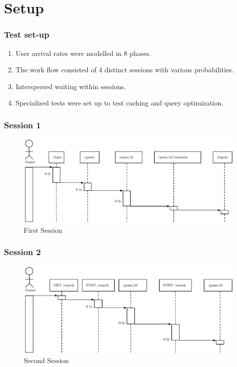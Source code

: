 \section{Setup}
\begin{frame}
\frametitle{Test set-up}

\begin{enumerate}[<+->]
	\setlength\itemsep{1em}
	\item User arrival rates were modelled in 8 phases.
	\item The work flow consisted of 4 distinct sessions with various probabilities.
	\item Interspersed waiting within sessions.
	\item Specialized tests were set up to test caching and query optimization.  
\end{enumerate}
\end{frame}

\begin{frame}
\frametitle{Session 1}
\begin{figure}[h]
	\centering
	\includegraphics[width=1\textwidth, height=0.5\textheight]{images/generic-1.pdf}
	\caption{First Session}\label{fig:sqlopt}
\end{figure}
\end{frame}

\begin{frame}
\frametitle{Session 2}
\begin{figure}[h]
	\centering
	\includegraphics[width=1\textwidth, height=0.5\textheight]{images/generic-2.pdf}
	\caption{Second Session}\label{fig:sqlopt}
\end{figure}
\end{frame}

